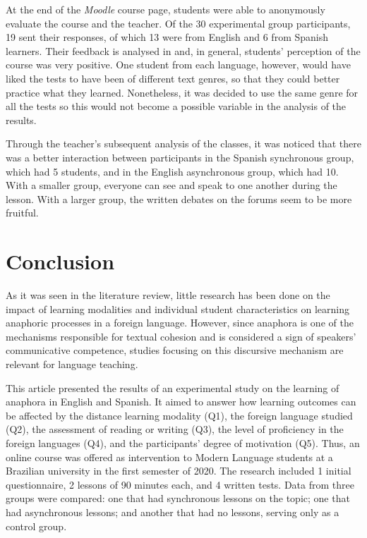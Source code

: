 \documentclass{textolivre}
\begin{document}
At the end of the \emph{Moodle} course page, students were able to
anonymously evaluate the course and the teacher. Of the 30 experimental
group participants, 19 sent their responses, of which 13 were from
English and 6 from Spanish learners. Their feedback is analysed in
\textcite{bruscato_ensino_2020} and, in general, students' perception of
the course was very positive. One student from each language, however,
would have liked the tests to have been of different text genres, so
that they could better practice what they learned. Nonetheless, it was
decided to use the same genre for all the tests so this would not become
a possible variable in the analysis of the results.

Through the teacher's subsequent analysis of the classes, it was noticed
that there was a better interaction between participants in the Spanish
synchronous group, which had 5 students, and in the English asynchronous
group, which had 10. With a smaller group, everyone can see and speak to
one another during the lesson. With a larger group, the written debates
on the forums seem to be more fruitful.

\section{Conclusion}\label{sec-conclusion}
As it was seen in the literature review, little research has been done
on the impact of learning modalities and individual student
characteristics on learning anaphoric processes in a foreign language.
However, since anaphora is one of the mechanisms responsible for textual
cohesion and is considered a sign of speakers' communicative competence,
studies focusing on this discursive mechanism are relevant for language
teaching.

This article presented the results of an experimental study on the
learning of anaphora in English and Spanish. It aimed to answer how
learning outcomes can be affected by the distance learning modality
(Q1), the foreign language studied (Q2), the assessment of reading or
writing (Q3), the level of proficiency in the foreign languages (Q4),
and the participants' degree of motivation (Q5). Thus, an online course
was offered as intervention to Modern Language students at a Brazilian
university in the first semester of 2020. The research included 1
initial questionnaire, 2 lessons of 90 minutes each, and 4 written
tests. Data from three groups were compared: one that had synchronous
lessons on the topic; one that had asynchronous lessons; and another
that had no lessons, serving only as a control group.
\end{document}
